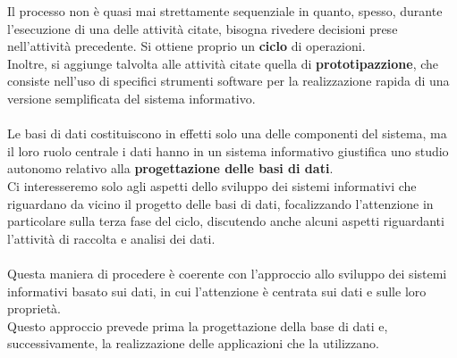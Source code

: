 Il processo non è quasi mai strettamente sequenziale in quanto, spesso, durante l'esecuzione di una delle attività citate, bisogna rivedere decisioni prese nell'attività precedente. Si ottiene proprio un \textbf{ciclo} di operazioni.\\
Inoltre, si aggiunge talvolta alle attività citate quella di \textbf{prototipazzione}, che consiste nell'uso di specifici strumenti software per la realizzazione rapida di una versione semplificata del sistema informativo.\\\\
Le basi di dati costituiscono in effetti solo una delle componenti del sistema, ma il loro ruolo centrale i dati hanno in un sistema informativo giustifica uno studio autonomo relativo alla \textbf{progettazione delle basi di dati}.\\
Ci interesseremo solo agli aspetti dello sviluppo dei sistemi informativi che riguardano da vicino il progetto delle basi di dati, focalizzando l'attenzione in particolare sulla terza fase del ciclo, discutendo anche alcuni aspetti riguardanti l'attività di raccolta e analisi dei dati.\\\\
Questa maniera di procedere è coerente con l'approccio allo sviluppo dei sistemi informativi basato sui dati, in cui l'attenzione è centrata sui dati e sulle loro proprietà.\\
Questo approccio prevede prima la progettazione della base di dati e, successivamente, la realizzazione delle applicazioni che la utilizzano.

